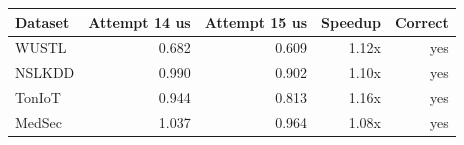 \begin{tabular}{lrrrr}
\toprule
Dataset & Attempt 14 us & Attempt 15 us & Speedup & Correct \\
\midrule
WUSTL & 0.682 & 0.609 & 1.12x & yes \\
NSLKDD & 0.990 & 0.902 & 1.10x & yes \\
TonIoT & 0.944 & 0.813 & 1.16x & yes \\
MedSec & 1.037 & 0.964 & 1.08x & yes \\
\bottomrule
\end{tabular}
